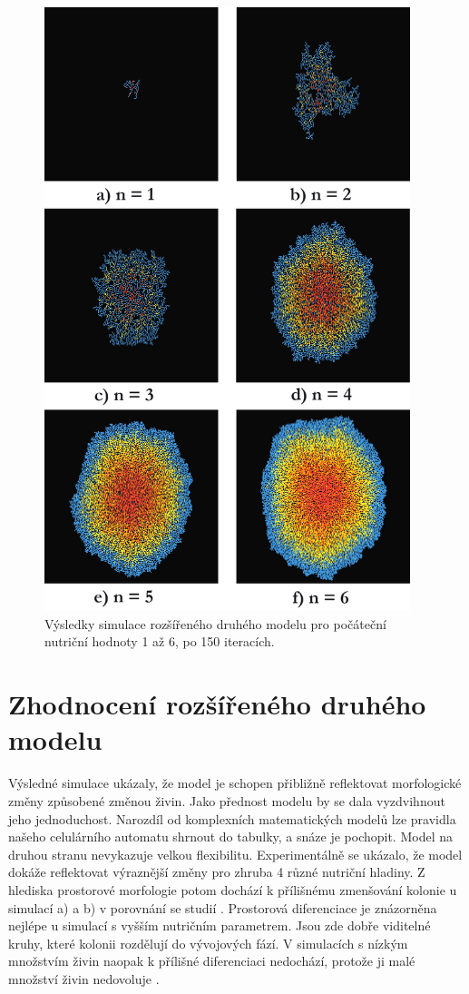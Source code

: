 \documentclass{article}
\begin{document}
\clearpage
\begin{figure}[ht]
\centering
\includegraphics[width=0.95\textwidth]{grid.jpg}
\caption{Výsledky simulace rozšířeného druhého modelu pro počáteční nutriční hodnoty 1 až 6, po 150 iteracích.}
\label{grid}
\end{figure}
\clearpage

\section{Zhodnocení rozšířeného druhého modelu}
Výsledné simulace ukázaly, že model je schopen přibližně reflektovat morfologické změny způsobené změnou živin. Jako přednost modelu by se dala vyzdvihnout jeho jednoduchost. Narozdíl od komplexních matematických modelů lze pravidla našeho celulárního automatu shrnout do tabulky, a snáze je pochopit. Model na druhou stranu nevykazuje velkou flexibilitu. Experimentálně se ukázalo, že model dokáže reflektovat výraznější změny pro zhruba 4 různé nutriční hladiny. Z hlediska prostorové morfologie potom dochází k přílišnému zmenšování kolonie u simulací a) a b) v porovnání se studií \cite{morphological}. Prostorová diferenciace je znázorněna nejlépe u simulací s vyšším nutričním parametrem. Jsou zde dobře viditelné kruhy, které kolonii rozdělují do vývojových fází. V simulacích s nízkým množstvím živin naopak k přílišné diferenciaci nedochází, protože ji malé množství živin nedovoluje \cite{differentiation}. 
\end{document}
